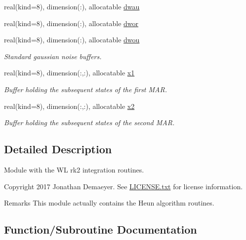 \begin{DoxyCompactItemize}
\item 
real(kind=8), dimension(\+:), allocatable \hyperlink{namespacerk2__wl__integrator_afa336c0cb10e6befa1ccc44522e2f517}{dwau}
\item 
real(kind=8), dimension(\+:), allocatable \hyperlink{namespacerk2__wl__integrator_a94b90cb88115b2d39977de8b89909833}{dwor}
\item 
real(kind=8), dimension(\+:), allocatable \hyperlink{namespacerk2__wl__integrator_a1e05e6efc7acdce81954944c134ac83b}{dwou}
\begin{DoxyCompactList}\small\item\em Standard gaussian noise buffers. \end{DoxyCompactList}\item 
real(kind=8), dimension(\+:,\+:), allocatable \hyperlink{namespacerk2__wl__integrator_a5fd86898081b24e076b0830a5d1e9e51}{x1}
\begin{DoxyCompactList}\small\item\em Buffer holding the subsequent states of the first M\+AR. \end{DoxyCompactList}\item 
real(kind=8), dimension(\+:,\+:), allocatable \hyperlink{namespacerk2__wl__integrator_a7fad5dbd04a9b5dc47bdb9b8c33e44e0}{x2}
\begin{DoxyCompactList}\small\item\em Buffer holding the subsequent states of the second M\+AR. \end{DoxyCompactList}\end{DoxyCompactItemize}


\subsection{Detailed Description}
Module with the WL rk2 integration routines. 

\begin{DoxyCopyright}{Copyright}
2017 Jonathan Demaeyer. See \hyperlink{LICENSE_8txt}{L\+I\+C\+E\+N\+S\+E.\+txt} for license information. 
\end{DoxyCopyright}
\begin{DoxyRemark}{Remarks}
This module actually contains the Heun algorithm routines. 
\end{DoxyRemark}


\subsection{Function/\+Subroutine Documentation}
